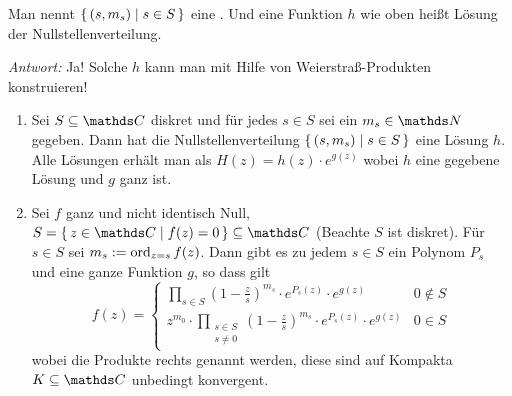Man nennt $\left\{\,(s, m_s) \mid s\in S\,\right\}$ eine .
Und eine Funktion $h$ wie oben heißt Lösung der Nullstellenverteilung.

\noindent\emph{Antwort:} Ja! Solche $h$ kann man mit Hilfe von Weierstraß-Produkten konstruieren!


\begin{satz}\label{satz:weierstrasprodukt}
\begin{enumerate}
\item Sei $S\subseteq \CC$ diskret und für jedes $s\in S$ sei ein $m_s \in \NN$ gegeben. Dann hat die Nullstellenverteilung $\left\{\,(s, m_s) \mid s\in S\,\right\}$ eine Lösung $h$.
Alle Lösungen erhält man als $H(z) = h(z)\cdot e^{g(z)}$ wobei $h$ eine gegebene Lösung und $g$ ganz ist.

\item Sei $f$ ganz und nicht identisch Null, $S=\Set{z\in\CC \mid f(z) = 0}\subseteq\CC$ (Beachte $S$ ist diskret).
Für $s\in S$ sei $m_s := \operatorname*{ord}_{z=s} f(z)$.
Dann gibt es zu jedem $s\in S$ ein Polynom $P_s$ und eine ganze Funktion $g$, so dass gilt
\[
	f(z) =
	\begin{cases}
		\displaystyle \prod_{s\in S} \left(1-\frac{z}{s}\right)^{m_s}\cdot e^{P_s(z)}\cdot e^{g(z)} & 0 \not\in S \\
		\displaystyle z^{m_0} \cdot \prod_{\substack{s\in S\\ \scriptscriptstyle s\not=0}} \left(1-\frac{z}{s}\right)^{m_s}\cdot e^{P_s(z)}\cdot e^{g(z)} & 0 \in S
	\end{cases}
\]
wobei die Produkte rechts  genannt werden, diese sind auf Kompakta $K\subseteq \CC$ unbedingt konvergent.
\end{enumerate}
\end{satz}

